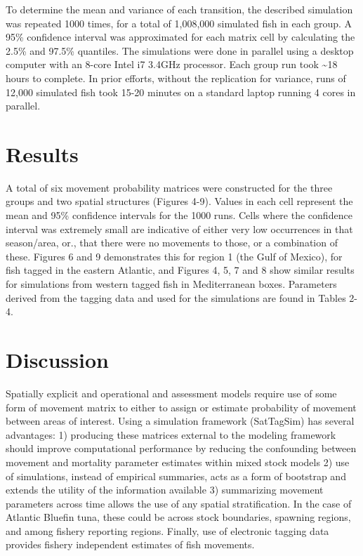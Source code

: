 \documentclass[
  authoryear,
  preprint,
  5p,
  onecolumn]{elsarticle}
\begin{document}
To determine the mean and variance of each transition, the described
simulation was repeated 1000 times, for a total of 1,008,000 simulated
fish in each group. A 95\% confidence interval was approximated for each
matrix cell by calculating the 2.5\% and 97.5\% quantiles. The
simulations were done in parallel using a desktop computer with an
8-core Intel i7 3.4GHz processor. Each group run took \textasciitilde18
hours to complete. In prior efforts, without the replication for
variance, runs of 12,000 simulated fish took 15-20 minutes on a standard
laptop running 4 cores in parallel.

\section{Results}\label{results}

A total of six movement probability matrices were constructed for the
three groups and two spatial structures (Figures 4-9). Values in each
cell represent the mean and 95\% confidence intervals for the 1000 runs.
Cells where the confidence interval was extremely small are indicative
of either very low occurrences in that season/area, or., that there were
no movements to those, or a combination of these. Figures 6 and 9
demonstrates this for region 1 (the Gulf of Mexico), for fish tagged in
the eastern Atlantic, and Figures 4, 5, 7 and 8 show similar results for
simulations from western tagged fish in Mediterranean boxes. Parameters
derived from the tagging data and used for the simulations are found in
Tables 2-4.

\section{Discussion}\label{discussion}

Spatially explicit and operational and assessment models require use of
some form of movement matrix to either to assign or estimate probability
of movement between areas of interest. Using a simulation framework
(SatTagSim) has several advantages: 1) producing these matrices external
to the modeling framework should improve computational performance by
reducing the confounding between movement and mortality parameter
estimates within mixed stock models 2) use of simulations, instead of
empirical summaries, acts as a form of bootstrap and extends the utility
of the information available 3) summarizing movement parameters across
time allows the use of any spatial stratification. In the case of
Atlantic Bluefin tuna, these could be across stock boundaries, spawning
regions, and among fishery reporting regions. Finally, use of electronic
tagging data provides fishery independent estimates of fish movements.
\end{document}
